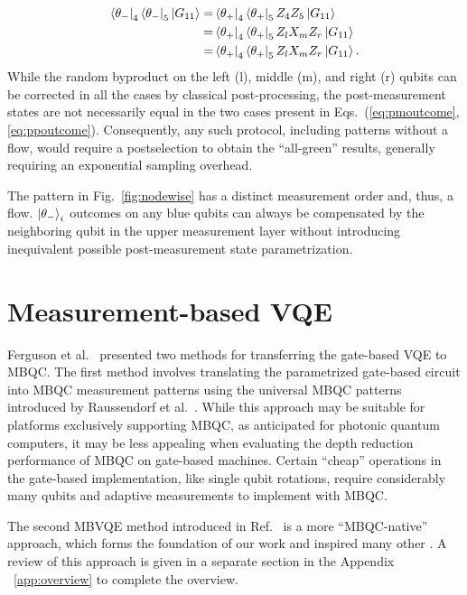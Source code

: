\documentclass[../main.tex]{subfiles}
\begin{document}
\begin{align}\label{eq:ppoutcome}
    \bra{\theta_-}_4 \bra{\theta_-}_5 \ket{G_{11}} =&\bra{\theta_+}_4 \bra{\theta_+}_5 Z_4Z_5\ket{G_{11}} \\
=&\bra{\theta_+}_4 \bra{\theta_+}_5  Z_l X_m Z_r  \ket{G_{11}} \\
=& \bra{\theta_+}_4 \bra{\theta_+}_5  Z_l X_m Z_r  \ket{G_{11}}.
\end{align}
While the random byproduct on the left (l), middle (m), and right (r) qubits can be corrected in all the cases by classical post-processing, the post-measurement states are not necessarily equal in the two cases present in Eqs.~(\ref{eq:pmoutcome}, \ref{eq:ppoutcome}).
Consequently, any such protocol, including patterns without a flow, would require a postselection to obtain the ``all-green'' results, generally requiring an exponential sampling overhead. 

The pattern in Fig.~\ref{fig:nodewise} has a distinct measurement order and, thus, a flow. $\ket{\theta_-}_i$ outcomes on any blue qubits can always be compensated by the neighboring qubit in the upper measurement layer without introducing inequivalent possible post-measurement state parametrization.


\section{Measurement-based VQE}\label{sec:detmbvqe}

Ferguson et al.~\cite{ferguson2021measurement} presented two methods for transferring the gate-based VQE to MBQC. The first method involves translating the parametrized gate-based circuit into MBQC measurement patterns using the universal MBQC patterns introduced by Raussendorf et al.~\cite{raussendorf2003measurement}. 
While this approach may be suitable for platforms exclusively supporting MBQC, as anticipated for photonic quantum computers, it may be less appealing when evaluating the depth reduction performance of MBQC on gate-based machines. Certain ``cheap'' operations in the gate-based implementation, like single qubit rotations, require considerably many qubits and adaptive measurements to implement with MBQC.

The second MBVQE method introduced in Ref.~\cite{ferguson2021measurement} is a more ``MBQC-native'' approach, which forms the foundation of our work and inspired many other \cite{proietti2022native,qin2023applicability,chan2023hybrid,marqversen2023applications,majumder2023variational}. A review of this approach is given in a separate section in the Appendix ~\ref{app:overview} to complete the overview. 
\end{document}
